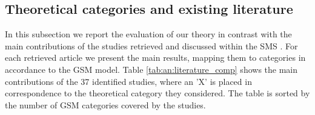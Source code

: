 \documentclass[10pt,journal,letterpaper,compsoc]{IEEEtran}
\begin{document}
\subsection{Theoretical categories and existing literature}
\label{sect:theory:validation:sms}

In this subsection we report the evaluation of our theory in contrast with the 
main contributions of the studies retrieved and discussed within the SMS 
\cite{SMS}. For each retrieved article we present the main results, mapping them 
to categories in accordance to the GSM model. Table \ref{tab:an:literature_comp} 
shows the main contributions of the 37 identified studies, where an 'X' is 
placed in correspondence to the theoretical category they considered. The table 
is sorted by the number of GSM categories covered by the studies.
\end{document}
